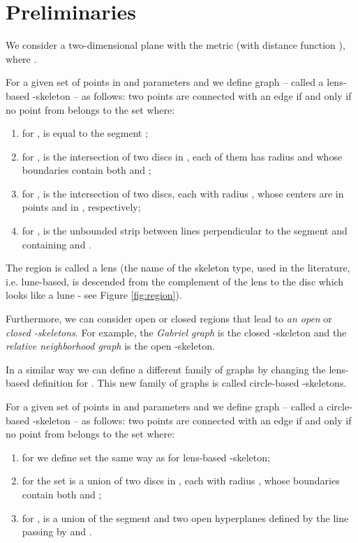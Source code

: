 \documentclass[11pt]{llncs}
\begin{document}
\section{Preliminaries}

We consider a two-dimensional plane  with the  metric (with distance 
function ), where . 

\begin{definition} \cite{kr85}
\label{betaskeleton}
For a given set of points   in  and parameters 
 and  we define graph 
 -- called a lens-based -skeleton -- as follows:  
two points  are connected with an edge if and only if no point 
from  belongs to the set 
 where:

\begin{enumerate} 
\item 
for ,   is equal to the segment ;
\item 
for ,  is the intersection of two discs in , 
each of them has
radius  and whose boundaries contain both  and ;
\item 
for ,  is the intersection of two  
discs, each with radius , whose centers are in points 
 and 
in , respectively;
\item 
for ,  is the unbounded strip between lines 
perpendicular to the segment  and containing  and .
\end{enumerate}

The region  is called a lens (the name of the skeleton type, used 
in the literature, i.e. lune-based, is descended from the complement of the lens to the disc 
which looks like a lune - see Figure \ref{fig:region}). 
\end{definition}

Furthermore,  we can  consider  open or closed  regions
that lead to {\em an open} or {\em closed -skeletons}. For example,  the
{\em Gabriel graph} is the closed -skeleton and the
{\em relative neighborhood graph} is the open -skeleton.

In a similar way we can define a different family of graphs by changing 
the lens-based definition for . This new family of graphs is called 
circle-based -skeletons. \\ 

\begin{definition} \cite{e02}
For a given set of points   in  and parameters 
 and  we define graph 
 -- called a circle-based -skeleton -- as follows:  
two points  are connected with an edge if and only if no point 
from  belongs to the set 
 where:
\begin{enumerate}
\item
for  we define set  the same way as for lens-based -skeleton;
\item
for  the set  is a union of two discs in , 
each with radius , whose boundaries contain both  and ;
\item
for ,  is a union of the segment  and two open 
hyperplanes defined by the line passing by  and .
\end{enumerate} 
\end{definition}
\end{document}
